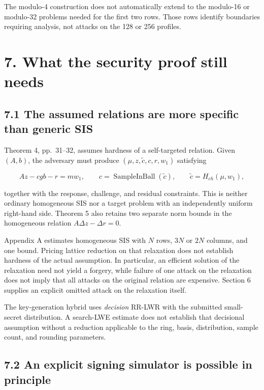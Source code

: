 \documentclass[
  american,
  10pt,
  a4paper,
]{article}
\begin{document}
The modulo-4 construction does not automatically extend to the modulo-16
or modulo-32 problems needed for the first two rows. Those rows identify
boundaries requiring analysis, not attacks on the 128 or 256 profiles.

\section{7. What the security proof still
needs}\label{what-the-security-proof-still-needs}

\subsection{7.1 The assumed relations are more specific than generic
SIS}\label{the-assumed-relations-are-more-specific-than-generic-sis}

Theorem 4, pp.~31--32, assumes hardness of a self-targeted relation.
Given \((A,b)\), the adversary must produce
\((\mu,z,\widetilde c,c,r,w_1)\) satisfying

\[
Az-cgb-r=mw_1,\qquad
c=\operatorname{SampleInBall}(\widetilde c),\qquad
\widetilde c=H_{ch}(\mu,w_1),
\]

together with the response, challenge, and residual constraints. This is
neither ordinary homogeneous SIS nor a target problem with an
independently uniform right-hand side. Theorem 5 also retains two
separate norm bounds in the homogeneous relation
\(A\Delta z-\Delta r=0\).

Appendix A estimates homogeneous SIS with \(N\) rows, \(3N\) or \(2N\)
columns, and one bound. Pricing lattice reduction on that relaxation
does not establish hardness of the actual assumption. In particular, an
efficient solution of the relaxation need not yield a forgery, while
failure of one attack on the relaxation does not imply that all attacks
on the original relation are expensive. Section 6 supplies an explicit
omitted attack on the relaxation itself.

The key-generation hybrid uses \emph{decision} RR-LWR with the submitted
small-secret distribution. A search-LWE estimate does not establish that
decisional assumption without a reduction applicable to the ring, basis,
distribution, sample count, and rounding parameters.

\subsection{7.2 An explicit signing simulator is possible in
principle}\label{an-explicit-signing-simulator-is-possible-in-principle}
\end{document}
